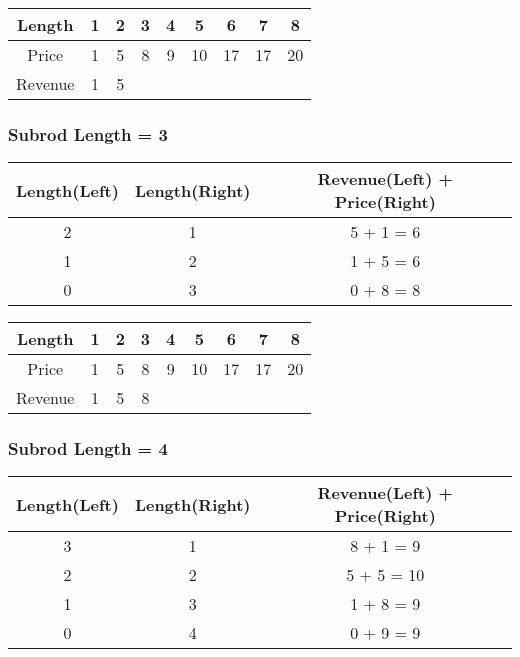 \begin{table}[H]
	\centering
	\begin{tabular}{| c | c | c | c | c | c | c | c | c |}
		\hline
		Length
		&	1
		&	2
		&	3
		&	4
		&	5
		&	6
		&	7
		&	8\\
		\hline
		Price
		&	1
		&	5
		&	8
		&	9
		&	10
		&	17
		&	17
		&	20\\
		\hline
		Revenue
		&	1
		&	5
		&	
		&
		&	
		&	
		&	
		&	\\
		\hline
	\end{tabular}
\end{table}

\subsubsection*{Subrod Length = 3}

\begin{table}[h]
	\centering
	\begin{tabular}{| c | c | c |}
		\hline
		Length(Left)	&	Length(Right)	&	Revenue(Left) + Price(Right)\\
		\hline
		2
		&	1
		&	5 + 1 = 6\\
		\hline
		1	
		&	2
		&	1 + 5 = 6\\
		\hline
		0
		&	3
		&	0 + 8 = 8\\
		\hline
	\end{tabular}	
\end{table}

\begin{table}[H]
	\centering
	\begin{tabular}{| c | c | c | c | c | c | c | c | c |}
		\hline
		Length
		&	1
		&	2
		&	3
		&	4
		&	5
		&	6
		&	7
		&	8\\
		\hline
		Price
		&	1
		&	5
		&	8
		&	9
		&	10
		&	17
		&	17
		&	20\\
		\hline
		Revenue
		&	1
		&	5
		&	8
		&
		&	
		&	
		&	
		&	\\
		\hline
	\end{tabular}
\end{table}

\newpage

\subsubsection*{Subrod Length = 4}

\begin{table}[H]
	\centering
	\begin{tabular}{| c | c | c |}
		\hline
		Length(Left)	&	Length(Right)	&	Revenue(Left) + Price(Right)\\
		\hline
		3
		&	1
		&	8 + 1 = 9\\
		\hline
		2	
		&	2
		&	5 + 5 = 10\\
		\hline
		1
		&	3
		&	1 + 8 = 9\\
		\hline
		0
		&	4
		&	0 + 9 = 9\\
		\hline
	\end{tabular}	
\end{table}

